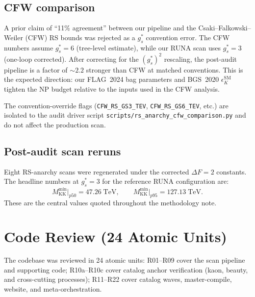 \documentclass[11pt]{article}
\newcommand{\Mkk}{M_{\mathrm{KK}}}
\newcommand{\gs}{g_s^*}
\newcommand{\eK}{\epsilon_K}
\begin{document}
\subsection{CFW comparison}
\label{sec:cfw}

A prior claim of ``11\% agreement'' between our pipeline and the
Csaki--Falkowski--Weiler (CFW) RS bounds was rejected as a $\gs$
convention error.  The CFW numbers assume $\gs = 6$ (tree-level
estimate), while our RUNA scan uses $\gs = 3$ (one-loop corrected).
After correcting for the $(\gs)^2$ rescaling, the post-audit pipeline
is a factor of $\sim\!2.2$ stronger than CFW at matched conventions.
This is the expected direction: our FLAG~2024 bag parameters and
BGS~2020 $\eK^{\mathrm{SM}}$ tighten the NP budget relative to the
inputs used in the CFW analysis.

The convention-override flags (\texttt{CFW\_RS\_GS3\_TEV},
\texttt{CFW\_RS\_GS6\_TEV}, etc.) are isolated to the audit driver
script \texttt{scripts/rs\_anarchy\_cfw\_comparison.py} and do not
affect the production scan.


\subsection{Post-audit scan reruns}
\label{sec:reruns}

Eight RS-anarchy scans were regenerated under the corrected
$\Delta F = 2$ constants.  The headline numbers at $\gs = 3$ for the
reference RUNA configuration are:
\begin{equation}\label{eq:headline}
  \Mkk^{\min}\big|_{p50} = 47.26\;\mathrm{TeV},\qquad
  \Mkk^{\min}\big|_{p95} = 127.13\;\mathrm{TeV}.
\end{equation}
These are the central values quoted throughout the methodology note.


\section{Code Review (24 Atomic Units)}
\label{sec:review}

The codebase was reviewed in 24 atomic units: R01--R09 cover the scan
pipeline and supporting code; R10a--R10c cover catalog anchor
verification (kaon, beauty, and cross-cutting processes); R11--R22
cover catalog waves, master-compile, website, and meta-orchestration.
\end{document}
